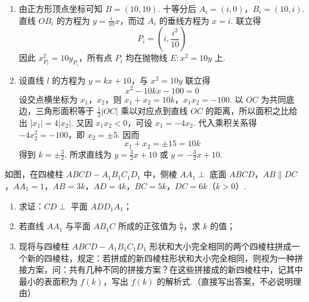\begin{solution}
\begin{enumerate}
\item 由正方形顶点坐标可知 \(B=(10,10)\). 十等分后 \(A_i=(i,0)\)，\(B_i=(10,i)\). 直线 \(OB_i\) 的方程为 \(y=\frac{i}{10}x\)，而过 \(A_i\) 的垂线方程为 \(x=i\). 联立得
\[
P_i=\left(i,\frac{i^2}{10}\right)
\]
因此 \(x_{P_i}^2=10y_{P_i}\)，所有点 \(P_i\) 均在抛物线 \(E:x^2=10y\) 上.
\item 设直线 \(l\) 的方程为 \(y=kx+10\)，与 \(x^2=10y\) 联立得
\[
x^2-10kx-100=0
\]
设交点横坐标为 \(x_1\)，\(x_2\)，则
\(x_1+x_2=10k\)，\(x_1x_2=-100\).
以 \(OC\) 为共同底边，三角形面积等于 \(\frac12|OC|\) 乘以对应点到直线 \(OC\) 的距离，所以面积之比给出 \(|x_1|=4|x_2|\). 又因 \(x_1x_2<0\)，可设 \(x_1=-4x_2\). 代入乘积关系得 \(-4x_2^2=-100\)，即 \(x_2=\pm5\). 因而
\[
x_1+x_2=\pm15=10k
\]
得到 \(k=\pm\frac32\). 所求直线为 \(y=\frac32x+10\) 或 \(y=-\frac32x+10\).
\end{enumerate}
\end{solution}

\begin{problem}
如图，在四棱柱 \(ABCD - A_1B_1C_1D_1\) 中，侧棱 \(AA_1 \perp\) 底面 \(ABCD\)，\(AB \parallel DC\)，\(AA_1 = 1\)，\(AB = 3k\)，\(AD = 4k\)，\(BC = 5k\)，\(DC = 6k\)（\(k > 0\)）.

\begin{enumerate}
\item 求证：\(CD \perp\) 平面 \(ADD_1A_1\)；
\item 若直线 \(AA_1\) 与平面 \(AB_1C\) 所成的正弦值为 \(\frac{6}{7}\)，求 \(k\) 的值；
\item 现将与四棱柱 \(ABCD - A_1B_1C_1D_1\) 形状和大小完全相同的两个四棱柱拼成一个新的四棱柱，规定：若拼成的新四棱柱形状和大小完全相同，则视为一种拼接方案，问：共有几种不同的拼接方案？在这些拼接成的新四棱柱中，记其中最小的表面积为 \(f(k)\)，写出 \(f(k)\) 的解析式.（直接写出答案，不必说明理由）
\end{enumerate}

\end{problem}

